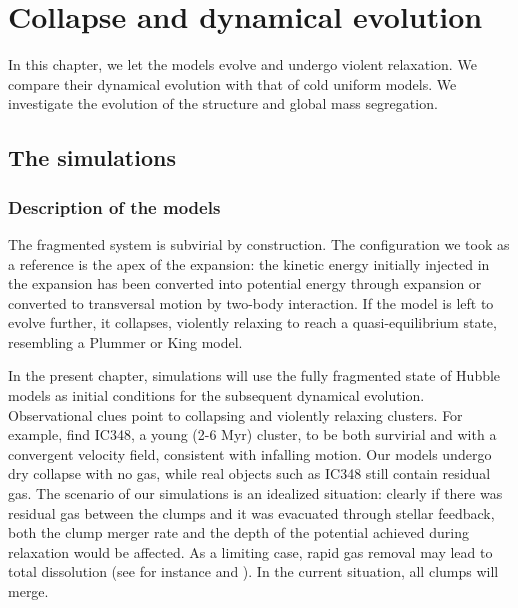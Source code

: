 

\chapter{Collapse and dynamical evolution}


In this chapter, we let the \HubLem models evolve and undergo violent relaxation. We compare their dynamical evolution with that of cold uniform models. We investigate the evolution of the structure and global mass segregation.

\minitoc

\section{The simulations}

\subsection{Description of the models}

The \HubLem fragmented system is subvirial by construction. The configuration we took as a reference is the apex of the expansion: the kinetic energy initially injected in the expansion has been converted into potential energy through expansion or converted to transversal motion by two-body interaction. If the model is left to evolve further, it collapses, violently relaxing to reach a quasi-equilibrium state, resembling a Plummer or King model.

In the present chapter, simulations will use the fully fragmented state of Hubble models as initial conditions for the subsequent dynamical evolution. Observational clues point to  collapsing and violently relaxing clusters. For example, \cite{Cottaar2015} find IC348, a young (2-6 Myr) cluster, to be both survirial and with a convergent velocity field, consistent with infalling motion. Our models undergo dry collapse with no gas, while real objects such as IC348 still contain residual gas. The scenario of our simulations is an idealized situation: clearly if there was residual gas between the clumps and it was evacuated through stellar feedback, both the clump merger rate and the depth of the potential achieved during relaxation would be affected. As a limiting case, rapid gas removal may lead to total dissolution (see for instance \citealt{Moeckel2012} and \citealt{Fujii2016}). In the current situation, all clumps will merge. 


